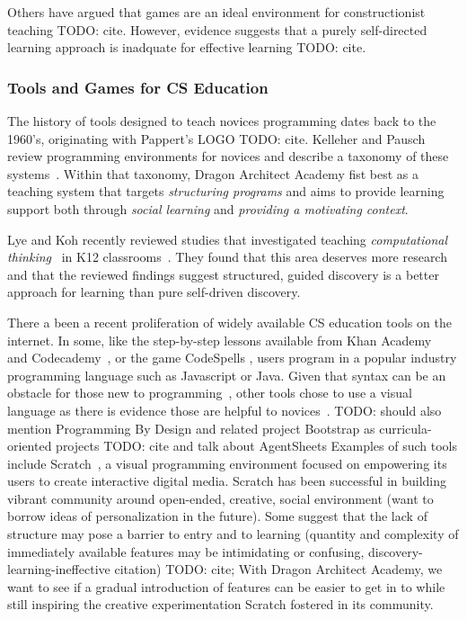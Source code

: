 \documentclass{sig-alternate}
\newcommand{\TODO}[1]{{\color{red} TODO: #1}}
\newcommand{\gametitle}{{\color{RoyalPurple} Dragon Architect Academy}}
\begin{document}
Others have argued that games are an ideal environment for constructionist teaching \TODO{cite}.
However, evidence suggests that a purely self-directed learning approach is inadquate for effective learning \TODO{cite}.

\subsubsection{Tools and Games for CS Education}
The history of tools designed to teach novices programming dates back to the 1960's, originating with Pappert's LOGO \TODO{cite}.
Kelleher and Pausch review programming environments for novices and describe a taxonomy of these systems~\cite{kelleher2005lowering}.
Within that taxonomy, \gametitle{} fist best as a teaching system that targets \emph{structuring programs} and aims to provide learning support both through \emph{social learning} and \emph{providing a motivating context}.

Lye and Koh recently reviewed studies that investigated teaching \emph{computational thinking}~\cite{wing2008computational} in K12 classrooms~\cite{lye2014review}.
They found that this area deserves more research and that
the reviewed findings suggest structured, guided discovery is a better approach for learning than pure self-driven discovery.



There a been a recent proliferation of widely available CS education tools on the internet.
In some, like the step-by-step lessons available from Khan Academy~\cite{khanacademy} and Codecademy~\cite{codecademy}, or the game CodeSpells \cite{esper2013codespells}, users program in a popular industry programming language such as Javascript or Java.
Given that syntax can be an obstacle for those new to programming~\cite{stefik2013syntax}, other tools chose to use a visual language as there is evidence those are helpful to novices~\cite{whitley1997visual}.
\TODO{should also mention Programming By Design and related project Bootstrap as curricula-oriented projects}
\TODO{cite and talk about AgentSheets}
Examples of such tools include Scratch~\cite{maloney2010scratch}, a visual programming environment focused on empowering its users to create interactive digital media.
Scratch has been successful in building vibrant community around open-ended, creative, social environment (want to borrow ideas of personalization in the future).
Some suggest that the lack of structure may pose a barrier to entry and to learning (quantity and complexity of immediately available features may be intimidating or confusing, discovery-learning-ineffective citation) \TODO{cite};
With \gametitle{}, we want to see if a gradual introduction of features can be easier to get in to while still inspiring the creative experimentation Scratch fostered in its community.
\end{document}

